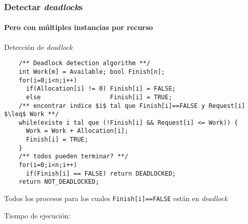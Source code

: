 \documentclass[letter]{beamer}
\begin{document}
\begin{frame}[fragile]
  \frametitle{Detectar {\em deadlock}s}
  \framesubtitle{Pero con múltiples instancias por recurso}
 
  Detección de {\em deadlock}
  
  \begin{verbatim}
    /** Deadlock detection algorithm **/
    int Work[m] = Available; bool Finish[n];
    for(i=0;i<n;i++)
      if(Allocation[i] != 0) Finish[i] = FALSE;
      else                   Finish[i] = TRUE;
    /** encontrar indice $i$ tal que Finish[i]==FALSE y Request[i] $\leq$ Work **/
    while(existe i tal que (!Finish[i] && Request[i] <= Work)) {
      Work = Work + Allocation[i];
      Finish[i] = TRUE;
    }
    /** todos pueden terminar? **/
    for(i=0;i<n;i++)
      if(Finish[i] == FALSE) return DEADLOCKED;
    return NOT_DEADLOCKED;
  \end{verbatim}
  Todos los procesos para los cuales {\tt Finish[i]==FALSE} están en {\em deadlock}
  
  Tiempo de ejecución: 

\end{frame}
\end{document}
